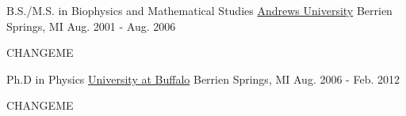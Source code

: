 

\begin{cventries}

  \cventry
    {B.S./M.S. in Biophysics and Mathematical Studies} %
    {\href{www.andrews.edu}{Andrews University}} %
    {Berrien Springs, MI} %
    {Aug. 2001 - Aug. 2006} %
    {
      \begin{cvitems} %
        \item {CHANGEME}
      \end{cvitems}
    }

  \cventry
    {Ph.D in Physics} %
    {\href{www.buffalo.edu}{University at Buffalo}} %
    {Berrien Springs, MI} %
    {Aug. 2006 - Feb. 2012} %
    {
      \begin{cvitems} %
        \item {CHANGEME}
      \end{cvitems}
    }

\end{cventries}

